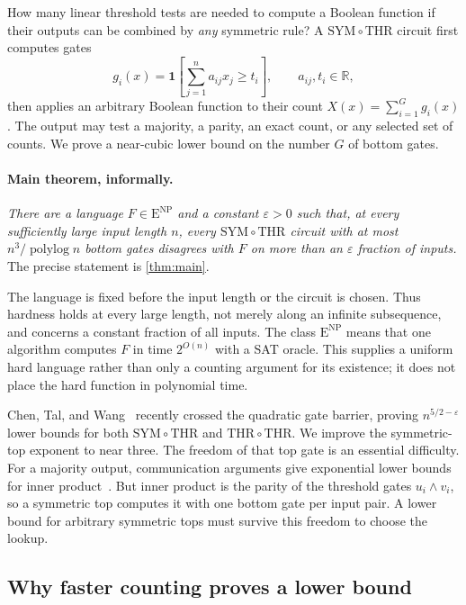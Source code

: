 \documentclass[11pt,letterpaper]{article}
\theoremstyle{definition}
\theoremstyle{remark}
\newcommand{\R}{\mathbb R}
\newcommand{\THR}{\mathrm{THR}}
\newcommand{\SYM}{\mathrm{SYM}}
\newcommand{\ENP}{\mathrm{E}^{\mathrm{NP}}}
\newcommand{\ind}{\mathbf 1}
\begin{document}
How many linear threshold tests are needed to compute a Boolean
function if their outputs can be combined by \emph{any} symmetric
rule? A \(\SYM\circ\THR\) circuit first computes gates
\[
 g_i(x)=\ind\!\left[\sum_{j=1}^n a_{ij}x_j\ge t_i\right],
 \qquad a_{ij},t_i\in\R,
\]
then applies an arbitrary Boolean function to their count
\(X(x)=\sum_{i=1}^G g_i(x)\). The output may test a majority, a
parity, an exact count, or any selected set of counts. We prove a
near-cubic lower bound on the number \(G\) of bottom gates.

\paragraph{Main theorem, informally.}
\emph{There are a language \(F\in\ENP\) and a constant
\(\varepsilon>0\) such that, at every sufficiently large input
length \(n\), every \(\SYM\circ\THR\) circuit with at most
\(n^3/\operatorname{polylog}n\) bottom gates disagrees with \(F\)
on more than an \(\varepsilon\) fraction of inputs.}
The precise statement is \cref{thm:main}.

The language is fixed before the input length or the circuit is
chosen. Thus hardness holds at every large length, not merely along
an infinite subsequence, and concerns a constant fraction of all
inputs. The class \(\ENP\) means that one algorithm computes \(F\)
in time \(2^{O(n)}\) with a SAT oracle. This supplies a uniform hard
language rather than only a counting argument for its existence;
it does not place the hard function in polynomial time.

Chen, Tal, and Wang~\cite{CTW26} recently crossed the quadratic gate
barrier, proving \(n^{5/2-\varepsilon}\) lower bounds for both
\(\SYM\circ\THR\) and \(\THR\circ\THR\). We improve the
symmetric-top exponent to near three. The freedom of that top gate
is an essential difficulty. For a majority output, communication
arguments give exponential lower bounds for inner
product~\cite{HMPST93,Nis94}. But inner product is the parity of the
threshold gates \(u_i\wedge v_i\), so a symmetric top computes it
with one bottom gate per input pair. A lower bound for arbitrary
symmetric tops must survive this freedom to choose the lookup.

\subsection{Why faster counting proves a lower bound}\label{sec:counting-bridge}
\end{document}
